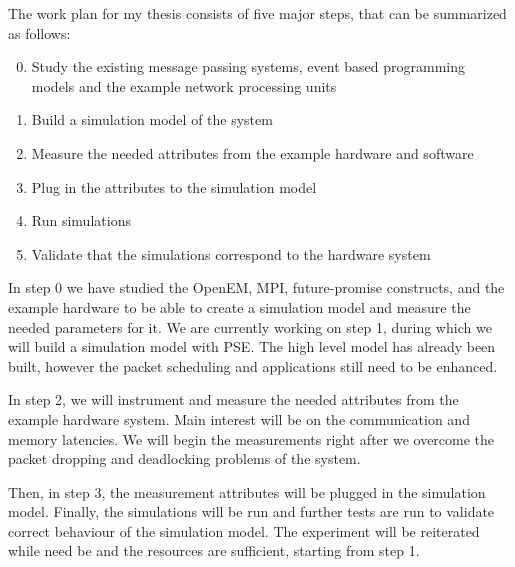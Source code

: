 The work plan for my thesis consists of five major steps, that can be summarized as follows:

\begin{enumerate}
\setcounter{enumi}{-1}
\item Study the existing message passing systems, event based programming models and the example network processing units
\item Build a simulation model of the system
\item Measure the needed attributes from the example hardware and software
\item Plug in the attributes to the simulation model
\item Run simulations
\item Validate that the simulations correspond to the hardware system
\end{enumerate}

In step 0 we have studied the OpenEM, MPI, future-promise constructs, and the example hardware to be able to create a simulation model and measure the needed parameters for it. We are currently working on step 1, during which we will build a simulation model with PSE. The high level model has already been built, however the packet scheduling and applications still need to be enhanced.

In step 2, we will instrument and measure the needed attributes from the example hardware system. Main interest will be on the communication and memory latencies. We will begin the measurements right after we overcome the packet dropping and deadlocking problems of the system.

Then, in step 3, the measurement attributes will be plugged in the simulation model. Finally, the simulations will be run and further tests are run to validate correct behaviour of the simulation model. The experiment will be reiterated while need be and the resources are sufficient, starting from step 1.

